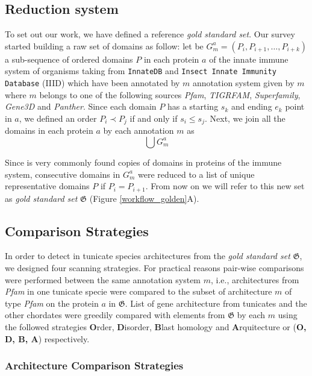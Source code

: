 \documentclass[11pt]{article}
\begin{document}
\subsection*{Reduction system} \label{reduction}
To set out our work, we have defined a reference \textsl{gold standard set}. 
Our survey started building a raw set of domains as follow: let be $G^{a}_{m} = 
(P_i,P_{i+1},\ldots,P_{i+k})$ a sub-sequence of ordered domains $P$ in each 
protein $a$ of the innate immune system of organisms taking from 
\texttt{InnateDB} and \texttt{Insect Innate Immunity Database} (IIID) which have 
been annotated by $m$ annotation system given by $m$ where $m$ belongs to one of 
the following sources \textsl{Pfam}, \textsl{TIGRFAM}, \textsl{Superfamily}, 
\textsl{Gene3D} and \textsl{Panther}. Since each domain $P$ has a starting $s_k$ 
and ending $e_k$ point in $a$, we defined an order $P_i \prec P_j$ if and only 
if $s_i \le s_j$. Next, we join all the domains in each protein $a$ by each 
annotation $m$ as \[\bigcup G^{a}_{m}\]

Since is very commonly found copies of domains in proteins of the immune 
system, consecutive domains in $G^{a}_{m}$ were reduced to a list of unique 
representative domains $P$ if $P_i = P_{i+1}$. From now on we will refer to this 
new set as \textsl{gold standard set} $\boldsymbol{\mathfrak{G}}$ (Figure 
\ref{workflow_golden}A).

\subsection*{Comparison Strategies} \label{comparison}
In order to detect in tunicate species architectures from the \textsl{gold 
standard set} $\boldsymbol{\mathfrak{G}}$, we designed four scanning 
strategies. For practical reasons pair-wise comparisons were performed between 
the same annotation system $m$, i.e., architectures from \textsl{Pfam} in one 
tunicate specie were compared to the subset of architecture $m$ of type 
\textsl{Pfam} on the protein $a$ in $\boldsymbol{\mathfrak{G}}$. List of gene 
architecture from tunicates and the other chordates were greedily compared with 
elements from $\boldsymbol{\mathfrak{G}}$ by each $m$ using the followed 
strategies \textbf{O}rder, \textbf{D}isorder, \textbf{B}last homology and 
\textbf{A}rquitecture or (\textbf{O, D, B, A}) respectively.

\subsubsection*{Architecture Comparison Strategies}
\end{document}
